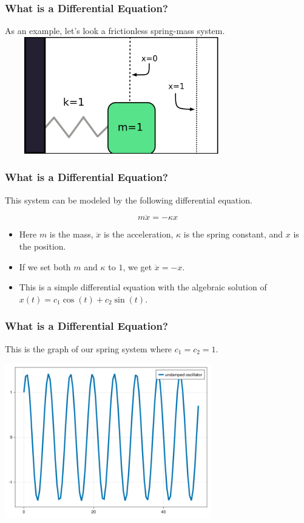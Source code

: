 \documentclass{beamer}
\begin{document}
 

\begin{frame}
    \frametitle{What is a Differential Equation?}
    As an example, let's look a frictionless spring-mass system.\\
    \vspace*{0.125in}
    \includegraphics[height=2in, width=4in]{spring-mass diagram.png}
\end{frame}


\begin{frame}
    \frametitle{What is a Differential Equation?}
    This system can be modeled by the following differential equation.\\
    \vspace*{0.125in}
    \begin{Large}
        $$m\ddot{x}=-\kappa{x}$$
    \end{Large}
    \vspace*{0.25in}
    \begin{itemize}
        \item Here $m$ is the mass, $\ddot{x}$ is the acceleration, $\kappa$ is the spring constant, and $x$ is the position.
        \item If we set both $m$ and $\kappa$ to $1$, we get $\ddot{x}=-x$.
        \item This is a simple differential equation with the algebraic solution of $x(t)=c_1\cos(t)+c_2\sin(t)$.
    \end{itemize}
\end{frame}


\begin{frame}
    \frametitle{What is a Differential Equation?}
    This is the graph of our spring system where $c_1=c_2=1$.\\
    \begin{center}
        \includegraphics[width=9cm]{undamped.png}
    \end{center}
\end{frame}
\end{document}
